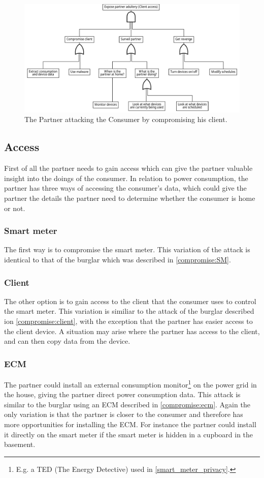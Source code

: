 \begin{figure}
  \includegraphics[width=\textwidth]{figures/graphviz/partner_vs_consumer_client.pdf}
  \caption{The Partner attacking the Consumer by compromising his client.}
  \label{fig:attack_trees:partner:cheater_client}
\end{figure}


\subsection{Access}
First of all the partner needs to gain access which can give the partner valuable insight into the doings of the consumer.
In relation to power consumption, the partner has three ways of accessing the consumer's data, which could give the partner the details the partner need to determine whether the consumer is home or not.

\subsubsection{Smart meter}
The first way is to compromise the smart meter.
This variation of the attack is identical to that of the burglar which was described in \cref{compromise:SM}.

\subsubsection{Client}
The other option is to gain access to the client that the consumer uses to control the smart meter.
This variation is similiar to the attack of the burglar described ion \cref{compromise:client}, with the exception that the partner has easier access to the client device.
A situation may arise where the partner has access to the client, and can then copy data from the device.

\subsubsection{ECM}
The partner could install an external consumption monitor\footnote{E.g. a TED (The Energy Detective) used in \cref {smart_meter_privacy}.} on the power grid in the house, giving the partner direct power consumption data.
This attack is similar to the burglar using an ECM described in \cref{compromise:ecm}.
Again the only variation is that the partner is closer to the consumer and therefore has more opportunities for installing the ECM.
For instance the partner could install it directly on the smart meter if the smart meter is hidden in a cupboard in the basement.

